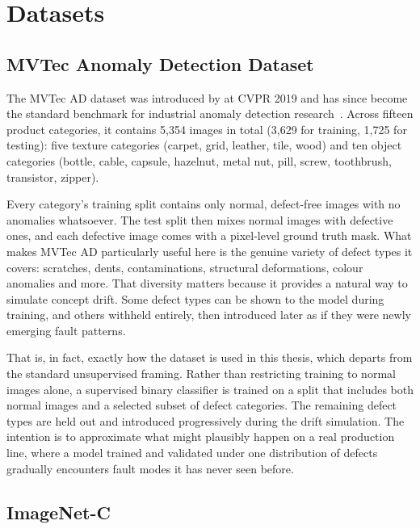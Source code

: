\section{Datasets}
\label{sec:datasets}

\subsection{MVTec Anomaly Detection Dataset}

The MVTec AD dataset was introduced by \textcite{Bergmann2019} at CVPR 2019 and has since become the standard benchmark for industrial anomaly detection research~\autocite{Ruff2021}. Across fifteen product categories, it contains 5,354 images in total (3,629 for training, 1,725 for testing): five texture categories (carpet, grid, leather, tile, wood) and ten object categories (bottle, cable, capsule, hazelnut, metal nut, pill, screw, toothbrush, transistor, zipper).

Every category's training split contains only normal, defect-free images with no anomalies whatsoever. The test split then mixes normal images with defective ones, and each defective image comes with a pixel-level ground truth mask. What makes MVTec AD particularly useful here is the genuine variety of defect types it covers: scratches, dents, contaminations, structural deformations, colour anomalies and more. That diversity matters because it provides a natural way to simulate concept drift. Some defect types can be shown to the model during training, and others withheld entirely, then introduced later as if they were newly emerging fault patterns.

That is, in fact, exactly how the dataset is used in this thesis, which departs from the standard unsupervised framing. Rather than restricting training to normal images alone, a supervised binary classifier is trained on a split that includes both normal images and a selected subset of defect categories. The remaining defect types are held out and introduced progressively during the drift simulation. The intention is to approximate what might plausibly happen on a real production line, where a model trained and validated under one distribution of defects gradually encounters fault modes it has never seen before.

\subsection{ImageNet-C}

